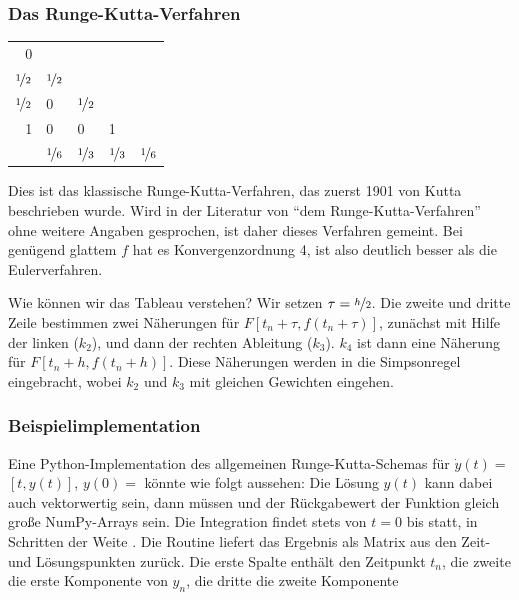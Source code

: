\subsubsection{Das Runge-Kutta-Verfahren}

\begin{center}
  \renewcommand{\arraystretch}{1.3}
  \begin{tabular}{r|llll}
    0 & \\
    $\nicefrac{1}{2}$ & $\nicefrac{1}{2}$ \\
    $\nicefrac{1}{2}$ & 0 & $\nicefrac{1}{2}$ \\
    1 & 0 & 0 & 1 \\
    \hline
    & $\nicefrac{1}{6}$ &  $\nicefrac{1}{3}$ & 
    $\nicefrac{1}{3}$ &  $\nicefrac{1}{6}$
  \end{tabular}
\end{center}
Dies ist das klassische Runge-Kutta-Verfahren, das zuerst 1901 von
Kutta beschrieben wurde. Wird in der Literatur von "`dem
Runge-Kutta-Verfahren"' ohne weitere Angaben gesprochen, ist daher
dieses Verfahren gemeint. Bei genügend glattem $f$ hat es
Konvergenzordnung 4, ist also deutlich besser als die Eulerverfahren.

Wie können wir das Tableau verstehen?  Wir setzen
$\tau=\nicefrac{h}{2}$. Die zweite und dritte Zeile bestimmen zwei
Näherungen für $F[t_n+\tau, f(t_n+\tau)]$, zunächst mit Hilfe der
linken ($k_2$), und dann der rechten Ableitung ($k_3$). $k_4$ ist dann
eine Näherung für $F[t_n+h, f(t_n+h)]$. Diese Näherungen werden in die
Simpsonregel eingebracht, wobei $k_2$ und $k_3$ mit gleichen Gewichten
eingehen.

\subsubsection{Beispielimplementation}

Eine Python-Implementation des allgemeinen Runge-Kutta-Schemas für
$\dot y(t) = $$[t, y(t)]$, $y(0) =$  könnte wie folgt
aussehen:%
%
Die Lösung $y(t)$ kann dabei auch vektorwertig sein, dann müssen
 und der Rückgabewert der Funktion  gleich große
NumPy-Arrays sein. Die Integration findet stets von $t=0$ bis
 statt, in Schritten der Weite .  Die Routine
liefert das Ergebnis als Matrix aus den Zeit- und Lösungspunkten
zurück. Die erste Spalte enthält den Zeitpunkt $t_n$, die zweite die
erste Komponente von $y_n$, die dritte die zweite Komponente \usw

